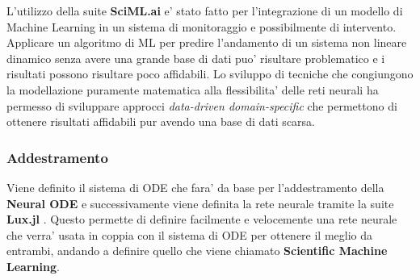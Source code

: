 L'utilizzo della suite \textbf{SciML.ai} e' stato fatto per l'integrazione
di un modello di Machine Learning in un sistema di monitoraggio e possibilmente di 
intervento. Applicare un algoritmo di ML per predire l'andamento di un sistema non lineare dinamico 
senza avere una grande base di dati puo' risultare problematico e i risultati possono risultare 
poco affidabili. Lo sviluppo di tecniche che congiungono la modellazione puramente matematica
alla flessibilita' delle reti neurali ha permesso di sviluppare approcci \emph{data-driven domain-specific} 
\cite{rackauckas2020universal} \cite{Kim_2021} \cite{dandekar2022bayesian} \cite{chen2019neural}
che permettono di ottenere risultati affidabili pur avendo una base di dati scarsa.

\subsubsection*{Addestramento}
Viene definito il sistema di ODE che fara' da base per l'addestramento della \textbf{Neural ODE} \cite{chen2019neural}
e successivamente viene definita la rete neurale tramite la suite \textbf{Lux.jl} \cite{pal2023lux}.
Questo permette di definire facilmente e velocemente una rete neurale che verra' usata 
in coppia con il sistema di ODE per ottenere il meglio da entrambi, andando a definire 
quello che viene chiamato \textbf{Scientific Machine Learning}.

